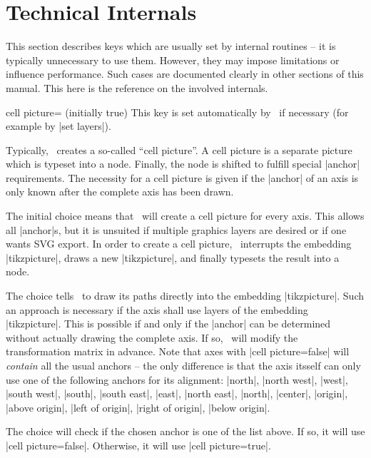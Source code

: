 \section{Technical Internals}
{
%

This section describes keys which are usually set by internal routines -- it is typically unnecessary to use them. However, they may impose limitations or influence performance. Such cases are documented clearly in other sections of this manual. This here is the reference on the involved internals.

\begin{pgfplotskey}{cell picture= (initially true)}
	This key is set automatically by \PGFPlots\ if necessary (for example by |set layers|).

	Typically, \PGFPlots\ creates a so-called ``cell picture''. A cell picture is a separate picture which is typeset into a node. Finally, the node is shifted to fulfill special |anchor| requirements. The necessity for a cell picture is given if the |anchor| of an axis is only known after the complete axis has been drawn.

	The initial choice  means that \PGFPlots\ will create a cell picture for every axis. This allows all |anchor|s, but it is unsuited if multiple graphics layers are desired or if one wants SVG export. In order to create a cell picture, \PGFPlots\ interrupts the embedding |tikzpicture|, draws a new |tikzpicture|, and finally typesets the result into a node.

	The choice  tells \PGFPlots\ to draw its paths directly into the embedding |tikzpicture|. Such an approach is necessary if the axis shall use layers of the embedding |tikzpicture|. This is possible if and only if the |anchor| can be determined without actually drawing the complete axis. If so, \PGFPlots\ will modify the transformation matrix in advance. Note that axes with |cell picture=false| will \emph{contain} all the usual anchors -- the only difference is that the axis itsself can only use one of the following anchors for its alignment: |north|, |north west|, |west|, |south west|, |south|, |south east|, |east|, |north east|, |north|, |center|, |origin|, |above origin|, |left of origin|, |right of origin|, |below origin|.

	The choice  will check if the chosen anchor is one of the list above. If so, it will use |cell picture=false|. Otherwise, it will use |cell picture=true|.


\end{pgfplotskey}}
